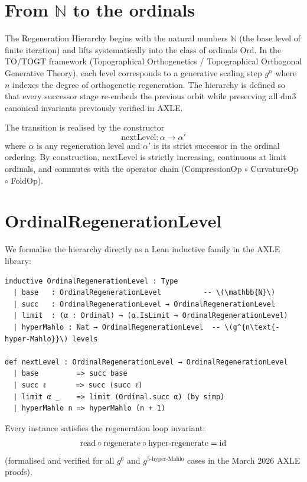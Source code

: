 \documentclass[19pt]{book}
\theoremstyle{plain}
\theoremstyle{definition}
\theoremstyle{remark}
\begin{document}
\section{From \(\mathbb{N}\) to the ordinals}

The Regeneration Hierarchy begins with the natural numbers \(\mathbb{N}\) (the base level of finite iteration) and lifts systematically into the class of ordinals \(\mathrm{Ord}\). In the TO/TOGT framework (Topographical Orthogenetics / Topographical Orthogonal Generative Theory), each level corresponds to a generative scaling step \(g^n\) where \(n\) indexes the degree of orthogenetic regeneration. The hierarchy is defined so that every successor stage re-embeds the previous orbit while preserving all dm3 canonical invariants previously verified in AXLE.

The transition is realised by the constructor
\[
\text{nextLevel} : \alpha \to \alpha'
\]
where \(\alpha\) is any regeneration level and \(\alpha'\) is its strict successor in the ordinal ordering. By construction, \(\text{nextLevel}\) is strictly increasing, continuous at limit ordinals, and commutes with the operator chain (CompressionOp \(\circ\) CurvatureOp \(\circ\) FoldOp).

\section{OrdinalRegenerationLevel}

We formalise the hierarchy directly as a Lean inductive family in the AXLE library:

\begin{lstlisting}[language=Lean,caption={OrdinalRegenerationLevel in AXLE/TOGT}]
inductive OrdinalRegenerationLevel : Type
  | base   : OrdinalRegenerationLevel          -- \(\mathbb{N}\)
  | succ   : OrdinalRegenerationLevel → OrdinalRegenerationLevel
  | limit  : (α : Ordinal) → (α.IsLimit → OrdinalRegenerationLevel)
  | hyperMahlo : Nat → OrdinalRegenerationLevel  -- \(g^{n\text{-hyper-Mahlo}}\) levels

def nextLevel : OrdinalRegenerationLevel → OrdinalRegenerationLevel
  | base         => succ base
  | succ ℓ       => succ (succ ℓ)
  | limit α _    => limit (Ordinal.succ α) (by simp)
  | hyperMahlo n => hyperMahlo (n + 1)
\end{lstlisting}

Every instance satisfies the regeneration loop invariant:
\[
\text{read} \circ \text{regenerate} \circ \text{hyper\text{-}regenerate} = \text{id}
\]
(formalised and verified for all \(g^6\) and \(g^{5\text{-hyper-Mahlo}}\) cases in the March 2026 AXLE proofs).
\end{document}
